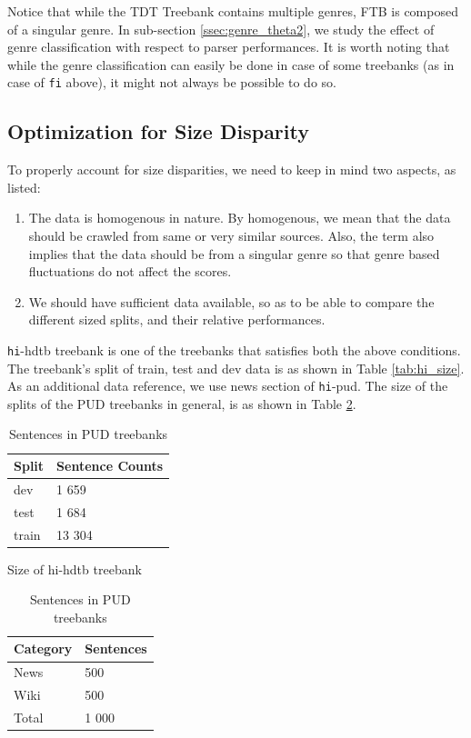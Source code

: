 Notice that while the TDT Treebank contains multiple genres, FTB is composed of a singular genre. In sub-section \ref{ssec:genre_theta2}, we study the effect of genre classification with respect to parser performances. It is worth noting that while the genre classification can easily be done in case of some treebanks (as in case of \verb|fi| above), it might not always be possible to do so.

\subsection{Optimization for Size Disparity}
\label{ssec:size_theta1}

To properly account for size disparities, we need to keep in mind two aspects, as listed:

\begin{enumerate}
    \item The data is homogenous in nature. By homogenous, we mean that the data should be crawled from same or very similar sources. Also, the term also implies that the data should be from a singular genre so that genre based fluctuations do not affect the scores.
    \item We should have sufficient data available, so as to be able to compare the different sized splits, and their relative performances.
\end{enumerate}

\verb|hi|-hdtb treebank is one of the treebanks that satisfies both the above conditions. The treebank's split of train, test and dev data is as shown in Table \ref{tab:hi_size}. As an additional data reference, we use news section of \verb|hi|-pud. The size of the splits of the PUD treebanks in general, is as shown in Table \ref{tab:hi_pud_size}.

\begin{table}[H]
    \begin{minipage}{.45\linewidth}
    \centering
    \begin{tabular}{l|l}
    Split & Sentence Counts \\
    \hline
    dev & 1 659 \\
    test & 1 684 \\
    train & 13 304 \\
    \end{tabular}
    \caption{Size of hi-hdtb treebank}
    \label{tab:hi_size}
    \end{minipage}%
    \begin{minipage}{.50\linewidth}
    \centering
    \begin{tabular}{l|l}
    Category & Sentences \\
    \hline
    News & 500 \\
    Wiki & 500 \\
    \hline
    Total & 1 000 \\
    \end{tabular}
    \caption{Sentences in PUD treebanks}
    \label{tab:hi_pud_size}
    \end{minipage}
\end{table}

